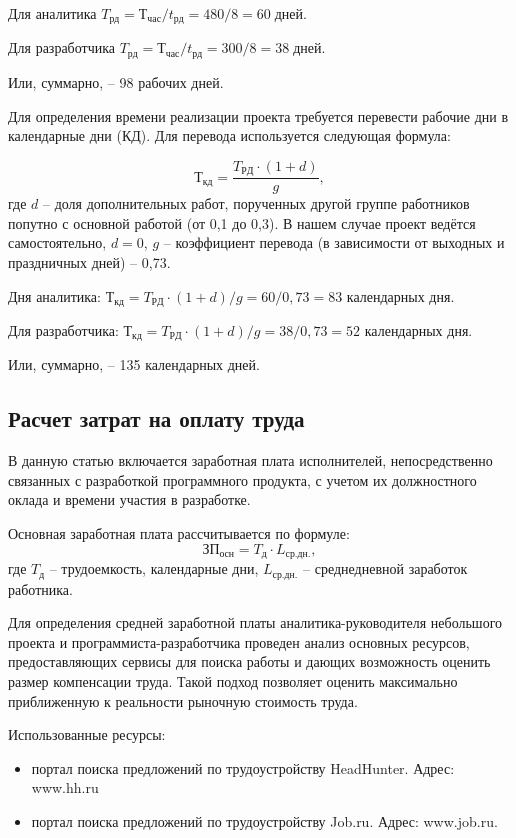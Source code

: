 Для аналитика $T_{рд} = Т_{час}/t_{рд} = 480/8 = 60 \; дней$.

Для разработчика $T_{рд} = Т_{час}/t_{рд} = 300/8 = 38 \; дней$.

Или, суммарно, – 98 рабочих дней.

Для определения времени реализации проекта требуется перевести рабочие дни в календарные дни (КД). Для перевода используется следующая формула:

$$Т_{кд}=\frac{T_{РД} \cdot (1+d) }{g},$$
где $d$ – доля дополнительных работ, порученных другой группе работников попутно с основной работой (от 0,1 до 0,3). В нашем случае проект ведётся самостоятельно, $d = 0$, $g$ – коэффициент перевода (в зависимости от выходных и праздничных дней) – 0,73.

Дня аналитика: $Т_{кд}={T_{РД} \cdot (1+d) }/{g} = 60/0,73 = 83 $ календарных дня.

Для разработчика: $Т_{кд}={T_{РД} \cdot (1+d) }/{g} = 38/0,73 = 52 $ календарных дня.

Или, суммарно, – 135 календарных дней.

\subsection{Расчет затрат на оплату труда}

В данную статью включается заработная плата исполнителей, непосредственно связанных с разработкой программного продукта, с учетом их должностного оклада и времени участия в разработке. 

Основная заработная плата рассчитывается по формуле:
$$ЗП_{осн}=T_{д} \cdot L_{ср.дн.},$$
где $T_{д}$ – трудоемкость, календарные дни, $L_{ср.дн.}$ – среднедневной заработок работника. 

Для определения средней заработной платы аналитика-руководителя небольшого проекта и программиста-разработчика проведен анализ основных ресурсов, предоставляющих сервисы для поиска работы и дающих возможность оценить размер компенсации труда. Такой подход позволяет оценить максимально приближенную к реальности рыночную стоимость труда.

Использованные ресурсы:
\begin{itemize}
	\item портал поиска предложений по трудоустройству HeadHunter. Адрес:  www.hh.ru
	\item портал поиска предложений по трудоустройству Job.ru. Адрес:  www.job.ru.
\end{itemize}


